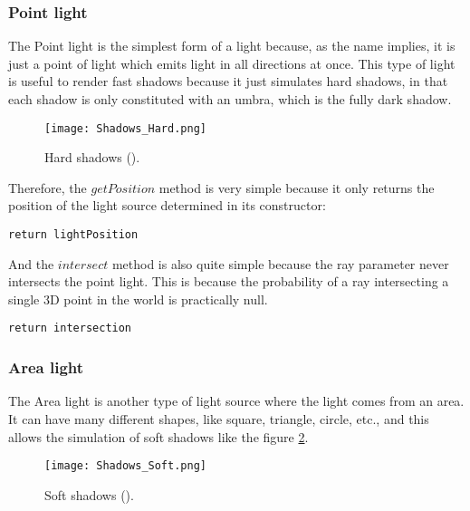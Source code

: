 \subsubsection{Point light}

\par
The Point light is the simplest form of a light because, as the name implies, it is just a point of light which emits light in all directions at once.
This type of light is useful to render fast shadows because it just simulates hard shadows, in that each shadow is only constituted with an umbra, which is the fully dark shadow.

\begin{figure}[H]
	\centering
	\caption{Hard shadows (\cite{Shadows}).}
	\label{Shadows_Hard.}
	\texttt{[image: Shadows\_Hard.png]}
\end{figure}

\par
Therefore, the
$getPosition$
method is very simple because it only returns the position of the light source determined in its constructor:

\begin{lstlisting}[caption={Algorithm of getPosition in Point light}, captionpos=b, label=getPositionPointLight]
return lightPosition
\end{lstlisting}

\par
And the
$intersect$
method is also quite simple because the ray parameter never intersects the point light.
This is because the probability of a ray intersecting a single 3D point in the world is practically null.

\begin{lstlisting}[caption={Algorithm of intersect in Point light}, captionpos=b, label=intersectPointLight]
return intersection
\end{lstlisting}

\subsubsection{Area light}

\par
The Area light is another type of light source where the light comes from an area.
It can have many different shapes, like square, triangle, circle, etc., and this allows the simulation of soft shadows like the figure \ref{Shadows_Soft.}.

\begin{figure}[H]
	\centering
	\caption{Soft shadows (\cite{Shadows}).}
	\label{Shadows_Soft.}
	\texttt{[image: Shadows\_Soft.png]}
\end{figure}

